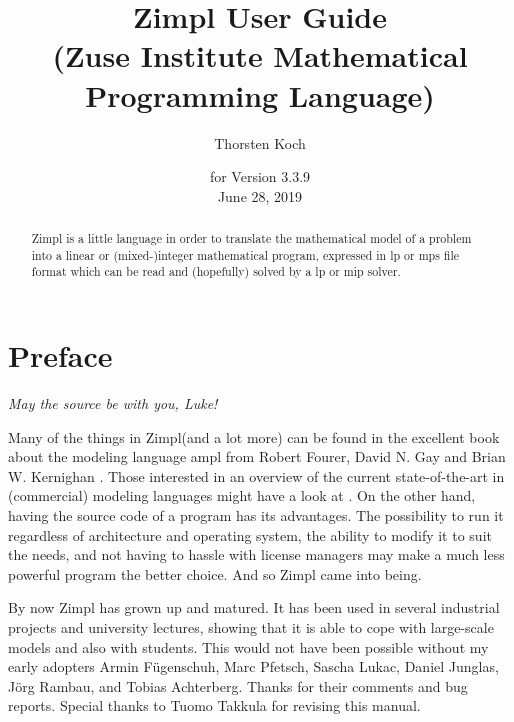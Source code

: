 \documentclass[11pt]{article}
\newcommand{\zimpl}{{\sc Zimpl}\xspace}
\newcommand{\lp}{{\sc lp}\xspace}
\newcommand{\mip}{{\sc mip}\xspace}
\newcommand{\mps}{{\sc mps}\xspace}
\newcommand{\lpf}{{\sc lp}\xspace}
\newcommand{\ampl}{{\sc ampl}\xspace}
\begin{document}

\title{
\LARGE\zimpl User Guide\\
\normalsize (Zuse Institute Mathematical Programming Language)}
\author{Thorsten Koch}
\date{\small for Version 3.3.9\\ June 28, 2019}
\maketitle
%
\tableofcontents
\newpage
\begin{abstract}
  \zimpl is a little language in order to translate the mathematical
  model of a problem into a linear or (mixed-)integer mathematical
  program, expressed in \lpf or \mps file format which can be read and
  (hopefully) solved by a \lp or \mip solver.
\end{abstract}


\section{Preface}
\begin{flushright}
{\em May the source be with you, Luke!}
\end{flushright}
Many of the things in \zimpl (and a lot more) can be found in 
the excellent book about the modeling language \ampl 
from Robert Fourer, David N. Gay and Brian W. Kernighan
\cite{FourierGayKernighan2003}. Those interested in an overview of the
current state-of-the-art in (commercial) modeling languages might have
a look at \cite{Kallrath2004}.
%
On the other hand, having the source code of a program has its
advantages. The possibility to run it regardless of architecture and
operating system, the ability to modify it to suit the needs, and not
having to hassle with license managers may make a much less powerful
program the better choice.  And so \zimpl came into being.

\bigskip
By now \zimpl has grown up and matured. It has been used in several
industrial projects and university lectures, showing that it is able to
cope with large-scale models and also with students.
This would not have been possible without my early adopters 
Armin F\"ugenschuh, Marc Pfetsch, Sascha Lukac, Daniel Junglas, J\"org
Rambau, and Tobias Achterberg. Thanks for their comments and bug
reports. Special thanks to Tuomo Takkula for revising this manual.
\end{document}
